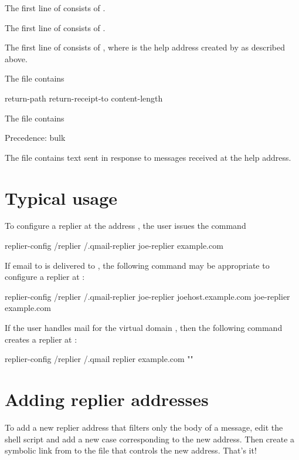 The first line of  consists of .

The first line of  consists of .

The first line of  consists of 
, where
 is the help address created by
 as described above.

The  file contains
\begin{code}
  return-path
  return-receipt-to
  content-length
\end{code}

The  file contains
\begin{code}
  Precedence: bulk
\end{code}

The  file contains text sent in response to
messages received at the help address.

\section{Typical usage}
To configure a replier at the address , the
user  issues the command
\begin{code}
  replier-config \swungdash /replier \swungdash /.qmail-replier joe-replier example.com
\end{code}

If email to  is delivered to
, the following command may be
appropriate to configure a replier at
:
\begin{code}
   replier-config \swungdash /replier \swungdash /.qmail-replier joe-replier joehost.example.com joe-replier example.com
\end{code}

If the user  handles mail for the virtual domain
, then the following command creates a
replier at :
\begin{code}
   replier-config \swungdash /replier \swungdash /.qmail replier example.com ""
\end{code}

\section{Adding replier addresses}
To add a new replier address that filters only the body of a message,
edit the  shell script and add a new case
corresponding to the new address.  Then create a symbolic link from
 to the  file that
controls the new address.  That's it!

